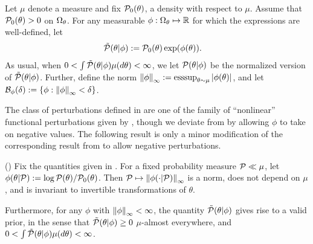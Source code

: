 \begin{defn}
%
Let $\mu$ denote a measure and fix $\mathcal{P}_{0}(\theta)$, a density with respect to
$\mu$.  Assume that $\mathcal{P}_{0}(\theta) > 0$ on $\Omega_{\theta}$. For any measurable
$\phi: \Omega_{\theta} \mapsto \mathbb{R}$ for which the expressions are well-defined,
let
%
\begin{align*}
\ptil(\theta \vert \phi) :={}& \pbase(\theta)\exp(\phi(\theta)).
%
\end{align*}
%
As usual, when $0 < \int \tilde{\mathcal{P}}(\theta \vert \phi) \mu(d\theta) < \infty$, we let
$\mathcal{P}(\theta \vert \phi)$ be the normalized version of $\tilde{\mathcal{P}}(\theta \vert \phi)$.
Further, define the norm $\left\Vert\phi\right\Vert_{\infty} := \operatorname*{\mathrm{esssup}}_{\theta \sim \mu}
\left|\phi(\theta)\right|$, and let $\mathcal{B}_\phi(\delta) := \left\{ \phi: \left\Vert\phi\right\Vert_{\infty} <
\delta \right\}$.
%
\end{defn}
%

The class of perturbations defined in  are one of the
family of ``nonlinear'' functional perturbations given by
\citet{gustafson:1996:local}, though we deviate from
\citet{gustafson:1996:local} by allowing $\phi$ to take on negative values. The
following result is only a minor modification of the corresponding result from
\citet{gustafson:1996:local} to allow negative perturbations.

\begin{lem}
%
(\citet{gustafson:1996:local})
%
Fix the quantities given in .  For a fixed probability
measure $\mathcal{P} \ll \mu$, let $\phi(\theta \vert \mathcal{P}) := \log \mathcal{P}(\theta) /
\mathcal{P}_{0}(\theta)$.  Then $\mathcal{P} \mapsto \left\Vert\phi(\cdot \vert \mathcal{P})\right\Vert_{\infty}$ is a
norm, does not depend on $\mu$, and is invariant to invertible transformations
of $\theta$.

Furthermore, for any $\phi$ with $\left\Vert\phi\right\Vert_{\infty} < \infty$, the quantity
$\tilde{\mathcal{P}}(\theta \vert \phi)$ gives rise to a valid prior, in the sense that
$\tilde{\mathcal{P}}(\theta \vert \phi) \ge 0$ $\mu$-almost everywhere, and
$0 < \int \tilde{\mathcal{P}}(\theta \vert \phi) \mu(d\theta) < \infty$.
%
%
\end{lem}


